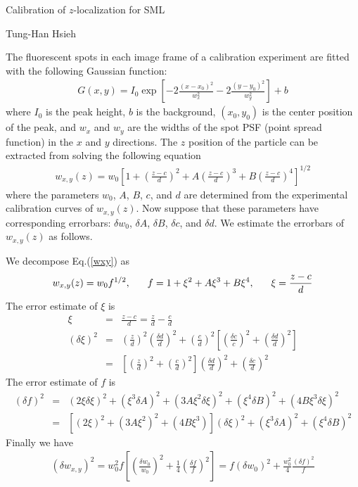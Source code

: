 \documentclass[12pt]{article}
\def\bea{\begin{eqnarray}}
\def\eea{\end{eqnarray}}
\def\Eq#1{Eq.(\ref{#1})}
\begin{document}
\centerline{\Large Calibration of $z$-localization for SML}
\vspace{5mm}
\centerline{\large Tung-Han Hsieh}
\vspace{6mm}

The fluorescent spots in each image frame of a calibration experiment are
fitted with the following Gaussian function:
\bea
G(x,y) = I_0 \exp\left[ -2\frac{(x-x_0)^2}{w_x^2}-2\frac{(y-y_0)^2}{w_y^2}
	\right] + b
\eea
where $I_0$ is the peak height, $b$ is the background, $(x_0,y_0)$ is the
center position of the peak, and $w_x$ and $w_y$ are the widths of the
spot PSF (point spread function) in the $x$ and $y$ directions. The $z$
position of the particle can be extracted from solving the following
equation
\bea\label{wxy}
w_{x,y}(z) = w_0 \left[ 1 +
	\left(\frac{z-c}{d}\right)^2
	+A \left(\frac{z-c}{d}\right)^3
	+B \left(\frac{z-c}{d}\right)^4\right]^{1/2}
\eea
where the parameters $w_0$, $A$, $B$, $c$, and $d$ are determined from
the experimental calibration curves of $w_{x,y}(z)$. Now suppose that
these parameters have corresponding errorbars: $\delta w_0$, $\delta A$,
$\delta B$, $\delta c$, and $\delta d$. We estimate the errorbars
of $w_{x,y}(z)$ as follows.

We decompose \Eq{wxy} as
\bea
w_{x,y}(z) = w_0 f^{1/2},
\hspace{6mm}
f = 1 + \xi^2 + A\xi^3 + B\xi^4,
\hspace{6mm}
\xi = \frac{z-c}{d}
\eea
The error estimate of $\xi$ is
\bea
\xi &=& \frac{z-c}{d} = \frac{z}{d} - \frac{c}{d}
\\
(\delta\xi)^2 &=&
	\left(\frac{z}{d}\right)^2
	\left(\frac{\delta d}{d}\right)^2
	+ \left(\frac{c}{d}\right)^2\left[
	  \left(\frac{\delta c}{c}\right)^2
	+ \left(\frac{\delta d}{d}\right)^2\right]
\nonumber \\ &=&
	\left[
	  \left(\frac{z}{d}\right)^2
	+ \left(\frac{c}{d}\right)^2\right]
	\left(\frac{\delta d}{d}\right)^2
	+ \left(\frac{\delta c}{d}\right)^2
\eea
The error estimate of $f$ is
\bea
(\delta f)^2 &=&
	(2\xi\delta\xi)^2
	+ (\xi^3\delta A)^2 + (3 A\xi^2\delta\xi)^2
	+ (\xi^4\delta B)^2 + (4 B\xi^3\delta\xi)^2
\nonumber \\ &=&
	[ (2\xi)^2 + (3 A\xi^2)^2 + (4 B\xi^3) ](\delta\xi)^2
	+ (\xi^3\delta A)^2 + (\xi^4\delta B)^2
\eea
Finally we have
\bea
(\delta w_{x,y})^2 = w_0^2 f\left[
	\left(\frac{\delta w_0}{w_0}\right)^2
	+ \frac{1}{4}\left(\frac{\delta f}{f}\right)^2\right]
= f(\delta w_0)^2 + \frac{w_0^2}{4}\frac{(\delta f)^2}{f}
\eea
\end{document}
